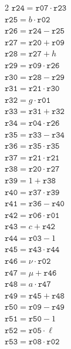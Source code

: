 \documentclass[10pt]{article}
\begin{document}
\begin{multicols}{2}
\(\mathtt{r24} = \mathtt{r07} \cdot \mathtt{r23}\)\\
\(\mathtt{r25} = b \cdot \mathtt{r02}\)\\
\(\mathtt{r26} = \mathtt{r24} - \mathtt{r25}\)\\
\(\mathtt{r27} = \mathtt{r20} + \mathtt{r09}\)\\
\(\mathtt{r28} = \mathtt{r27} + h\)\\
\(\mathtt{r29} = \mathtt{r09} \cdot \mathtt{r26}\)\\
\(\mathtt{r30} = \mathtt{r28} - \mathtt{r29}\)\\
\(\mathtt{r31} = \mathtt{r21} \cdot \mathtt{r30}\)\\
\(\mathtt{r32} = g \cdot \mathtt{r01}\)\\
\(\mathtt{r33} = \mathtt{r31} + \mathtt{r32}\)\\
\(\mathtt{r34} = \mathtt{r04} \cdot \mathtt{r26}\)\\
\(\mathtt{r35} = \mathtt{r33} - \mathtt{r34}\)\\
\(\mathtt{r36} = \mathtt{r35} \cdot \mathtt{r35}\)\\
\(\mathtt{r37} = \mathtt{r21} \cdot \mathtt{r21}\)\\
\(\mathtt{r38} = \mathtt{r20} \cdot \mathtt{r27}\)\\
\(\mathtt{r39} = 1 + \mathtt{r38}\)\\
\(\mathtt{r40} = \mathtt{r37} \cdot \mathtt{r39}\)\\
\(\mathtt{r41} = \mathtt{r36} - \mathtt{r40}\)\\
\(\mathtt{r42} = \mathtt{r06} \cdot \mathtt{r01}\)\\
\(\mathtt{r43} = c + \mathtt{r42}\)\\
\(\mathtt{r44} = \mathtt{r03} - 1\)\\
\(\mathtt{r45} = \mathtt{r43} \cdot \mathtt{r44}\)\\
\(\mathtt{r46} = \nu \cdot \mathtt{r02}\)\\
\(\mathtt{r47} = \mu + \mathtt{r46}\)\\
\(\mathtt{r48} = a \cdot \mathtt{r47}\)\\
\columnbreak
\(\mathtt{r49} = \mathtt{r45} + \mathtt{r48}\)\\
\(\mathtt{r50} = \mathtt{r09} - \mathtt{r49}\)\\
\(\mathtt{r51} = \mathtt{r50} - 1\)\\
\(\mathtt{r52} = \mathtt{r05} \cdot \ell\)\\
\(\mathtt{r53} = \mathtt{r08} \cdot \mathtt{r02}\)\\

\end{multicols}
\end{document}
